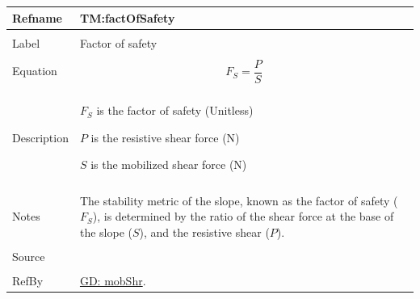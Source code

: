 \documentclass[12pt]{article}
\begin{document}
 \noindent \begin{minipage}{\textwidth}
\begin{tabular}{p{} p{}}
\toprule \textbf{Refname} & \textbf{TM:factOfSafety}
\label{TM:factOfSafety}
\\ \midrule \\
Label & Factor of safety
        \\ \midrule \\
        Equation & \begin{dmath}
                   {F_{S}}=\frac{P}{S}
                   \end{dmath}
                   \\ \midrule \\
                   Description & \begin{symbDescription}
                                 \item{${F_{S}}$ is the factor of safety (Unitless)}
                                 \item{$P$ is the resistive shear force (N)}
                                 \item{$S$ is the mobilized shear force (N)}
                                 \end{symbDescription}
                                 \\ \midrule \\
                                 Notes & The stability metric of the slope, known as the factor of safety (${F_{S}}$), is determined by the ratio of the shear force at the base of the slope ($S$), and the resistive shear ($P$).
                                         \\ \midrule \\
                                         Source & \cite{fredlund1977}
                                                  \\ \midrule \\
                                                  RefBy & \hyperref[GD:mobShr]{GD: mobShr}.
\\ \bottomrule \end{tabular}
\end{minipage}\\
~\newline
\end{document}
